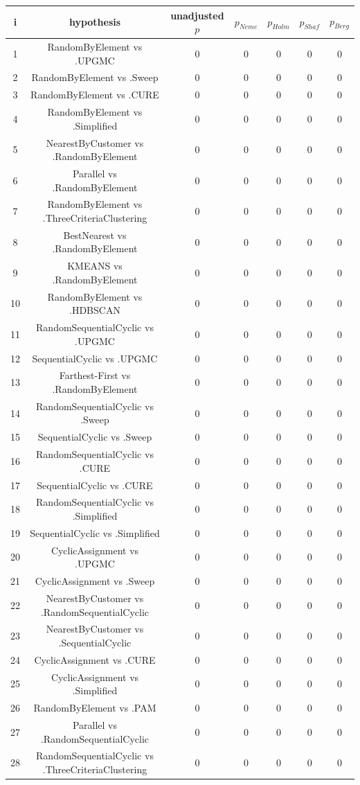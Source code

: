 \documentclass[a4paper,10pt]{article}
\begin{document}
\begin{landscape}
\begin{table}[!htp]
\centering\scriptsize
\begin{tabular}{ccccccc}
i&hypothesis&unadjusted $p$&$p_{Neme}$&$p_{Holm}$&$p_{Shaf}$&$p_{Berg}$\\
\hline1&RandomByElement vs .UPGMC&0&0&0&0&0\\
2&RandomByElement vs .Sweep&0&0&0&0&0\\
3&RandomByElement vs .CURE&0&0&0&0&0\\
4&RandomByElement vs .Simplified&0&0&0&0&0\\
5&NearestByCustomer vs .RandomByElement&0&0&0&0&0\\
6&Parallel vs .RandomByElement&0&0&0&0&0\\
7&RandomByElement vs .ThreeCriteriaClustering&0&0&0&0&0\\
8&BestNearest vs .RandomByElement&0&0&0&0&0\\
9&KMEANS vs .RandomByElement&0&0&0&0&0\\
10&RandomByElement vs .HDBSCAN&0&0&0&0&0\\
11&RandomSequentialCyclic vs .UPGMC&0&0&0&0&0\\
12&SequentialCyclic vs .UPGMC&0&0&0&0&0\\
13&Farthest-First vs .RandomByElement&0&0&0&0&0\\
14&RandomSequentialCyclic vs .Sweep&0&0&0&0&0\\
15&SequentialCyclic vs .Sweep&0&0&0&0&0\\
16&RandomSequentialCyclic vs .CURE&0&0&0&0&0\\
17&SequentialCyclic vs .CURE&0&0&0&0&0\\
18&RandomSequentialCyclic vs .Simplified&0&0&0&0&0\\
19&SequentialCyclic vs .Simplified&0&0&0&0&0\\
20&CyclicAssignment vs .UPGMC&0&0&0&0&0\\
21&CyclicAssignment vs .Sweep&0&0&0&0&0\\
22&NearestByCustomer vs .RandomSequentialCyclic&0&0&0&0&0\\
23&NearestByCustomer vs .SequentialCyclic&0&0&0&0&0\\
24&CyclicAssignment vs .CURE&0&0&0&0&0\\
25&CyclicAssignment vs .Simplified&0&0&0&0&0\\
26&RandomByElement vs .PAM&0&0&0&0&0\\
27&Parallel vs .RandomSequentialCyclic&0&0&0&0&0\\
28&RandomSequentialCyclic vs .ThreeCriteriaClustering&0&0&0&0&0\\

\end{tabular}
\end{table}
\end{landscape}
\end{document}
